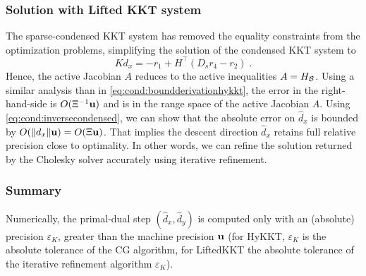 \subsubsection{Solution with Lifted KKT system}
The sparse-condensed KKT system has removed the equality
constraints from the optimization problems, simplifying
the solution of the condensed KKT system to
\begin{equation}
  \label{eq:cond:sckktstep}
  K d_x = -r_1 + H^\top (D_s r_4 - r_2) \; .
\end{equation}
Hence, the active Jacobian $A$ reduces to the active inequalities $A = H_{\mathcal{B}}$.
Using a similar analysis than in \eqref{eq:cond:boundderivationhykkt},
the error in the right-hand-side is $O(\Xi^{-1} \mathbf{u})$ and is in the
range space of the active Jacobian $A$. Using \eqref{eq:cond:inversecondensed},
we can show that the absolute error on $\widehat{d}_x$ is bounded by $O(\|d_x\| \mathbf{u})
= O(\Xi \mathbf{u})$. That implies the descent direction $\widehat{d}_x$ retains
full relative precision close to optimality.
In other words, we can refine the solution returned by the Cholesky solver accurately using
iterative refinement.

\subsubsection{Summary}
Numerically, the primal-dual step $(\widehat{d}_x, \widehat{d}_y)$
is computed only with an (absolute) precision $\varepsilon_{K}$,
greater than the machine precision $\mathbf{u}$ (for HyKKT, $\varepsilon_K$
is the absolute tolerance of the CG algorithm, for LiftedKKT the
absolute tolerance of the iterative refinement algorithm $\varepsilon_{K}$).

